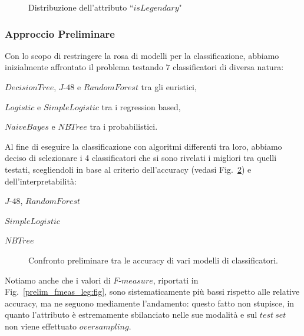 \documentclass[fleqn,10pt]{SelfArx} %
\begin{document}
\begin{figure}
\centering
{}
\caption{\label{barplot:fig} Distribuzione dell'attributo ``$isLegendary$"}
\end{figure}


\subsubsection{Approccio Preliminare}
Con lo scopo di restringere la rosa di modelli per la classificazione, abbiamo inizialmente affrontato il problema testando $7$ classificatori di diversa natura:

$DecisionTree$, $J$-$48$ e $RandomForest$ tra gli euristici,

$Logistic$ e $SimpleLogistic$ tra i regression based, 

$NaiveBayes$ e $NBTree$ tra i probabilistici.

Al fine di eseguire la classificazione con algoritmi differenti tra loro, abbiamo deciso di selezionare i 4 classificatori che si sono rivelati i migliori tra quelli testati, scegliendoli in base al criterio dell’accuracy (vedasi Fig.~\ref{preliminar_leg:fig}) e dell'interpretabilità:

$J$-$48$, $RandomForest$

$SimpleLogistic$

$NBTree$\\
\begin{figure}
\caption{\label{preliminar_leg:fig} Confronto preliminare tra le accuracy di vari modelli di classificatori.}
\end{figure}
Notiamo anche che i valori di $F$-$measure$, riportati in Fig.~\ref{prelim_fmeas_leg:fig}, sono sistematicamente più bassi rispetto alle relative accuracy, ma ne seguono mediamente l'andamento: questo fatto non stupisce, in quanto l'attributo è estremamente sbilanciato nelle sue modalità e sul $test\ set$ non viene effettuato $oversampling$.
\end{document}
